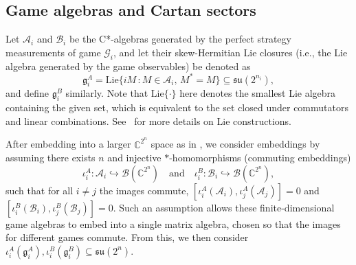 \documentclass{article}
\begin{document}
    \subsection{Game algebras and Cartan sectors}
    Let $\mathcal{A}_i$ and $\mathcal{B}_i$ be the C*-algebras generated by the perfect strategy measurements of game $\mathcal{G}_i$, and let their skew-Hermitian Lie closures (i.e., the Lie algebra generated by the game observables) be denoted as 
    \begin{equation}\label{eq: game lie algebra}
        \mathfrak{g}_i^A = \mathrm{Lie}\{iM\, : M\in\mathcal{A}_i, \, M^*=M\}\subseteq\mathfrak{su}(2^{n_i}),
    \end{equation}
    and define $\mathfrak{g}_i^B$ similarly. Note that $\mathrm{Lie}\{\cdot\}$ here denotes the smallest Lie algebra containing the given set, which is equivalent to the set closed under commutators and linear combinations. See~\cite{hall2013lie} for more details on Lie constructions. 

    After embedding into a larger $\mathbb{C}^{2^n}$ space as in , we consider embeddings by assuming there exists $n$ and injective $*$-homomorphisms (commuting embeddings)
    \begin{equation}\label{eq: embeddings}
        \iota_i^A:\mathcal{A}_i\hookrightarrow \mathcal{B}(\mathbb{C}^{2^n}) \quad\text{and}\quad \iota_i^B:\mathcal{B}_i\hookrightarrow \mathcal{B}(\mathbb{C}^{2^n}),
    \end{equation}
    such that for all $i\neq j$ the images commute,
    $[\iota_i^A(\mathcal{A}_i),\iota_j^A(\mathcal{A}_j)]=0$ and
    $[\iota_i^B(\mathcal{B}_i),\iota_j^B(\mathcal{B}_j)]=0$.
    Such an assumption allows these finite-dimensional game algebras to embed into a single matrix algebra, chosen so that the images for different games commute.  
    From this, we then consider $\iota_i^A(\mathfrak{g}_i^A),\iota_i^B(\mathfrak{g}_i^B)\subseteq \mathfrak{su}(2^n)$. 
\end{document}
